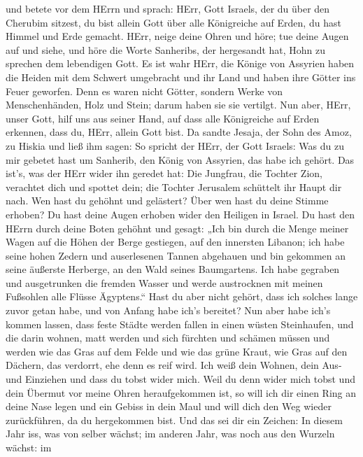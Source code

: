  und betete vor dem HErrn und sprach: HErr, Gott Israels,
der du über den Cherubim sitzest, du bist allein Gott über alle
Königreiche auf Erden, du hast Himmel und Erde gemacht. 
HErr, neige deine Ohren und höre; tue deine Augen auf und siehe, und
höre die Worte Sanheribs, der hergesandt hat, Hohn zu sprechen dem
lebendigen Gott.  Es ist wahr HErr, die Könige von Assyrien
haben die Heiden mit dem Schwert umgebracht und ihr Land 
und haben ihre Götter ins Feuer geworfen. Denn es waren nicht Götter,
sondern Werke von Menschenhänden, Holz und Stein; darum haben sie sie
vertilgt.  Nun aber, HErr, unser Gott, hilf uns aus seiner
Hand, auf dass alle Königreiche auf Erden erkennen, dass du, HErr,
allein Gott bist.  Da sandte Jesaja, der Sohn des Amoz, zu
Hiskia und ließ ihm sagen: So spricht der HErr, der Gott Israels: Was du
zu mir gebetet hast um Sanherib, den König von Assyrien, das habe ich
gehört.  Das ist's, was der HErr wider ihn geredet hat: Die
Jungfrau, die Tochter Zion, verachtet dich und spottet dein; die Tochter
Jerusalem schüttelt ihr Haupt dir nach.  Wen hast du
gehöhnt und gelästert? Über wen hast du deine Stimme erhoben? Du hast
deine Augen erhoben wider den Heiligen in Israel.  Du hast
den HErrn durch deine Boten gehöhnt und gesagt: „Ich bin durch die Menge
meiner Wagen auf die Höhen der Berge gestiegen, auf den innersten
Libanon; ich habe seine hohen Zedern und auserlesenen Tannen abgehauen
und bin gekommen an seine äußerste Herberge, an den Wald seines
Baumgartens.  Ich habe gegraben und ausgetrunken die
fremden Wasser und werde austrocknen mit meinen Fußsohlen alle Flüsse
Ägyptens.``  Hast du aber nicht gehört, dass ich solches
lange zuvor getan habe, und von Anfang habe ich's bereitet? Nun aber
habe ich's kommen lassen, dass feste Städte werden fallen in einen
wüsten Steinhaufen,  und die darin wohnen, matt werden und
sich fürchten und schämen müssen und werden wie das Gras auf dem Felde
und wie das grüne Kraut, wie Gras auf den Dächern, das verdorrt, ehe
denn es reif wird.  Ich weiß dein Wohnen, dein Aus- und
Einziehen und dass du tobst wider mich.  Weil du denn wider
mich tobst und dein Übermut vor meine Ohren heraufgekommen ist, so will
ich dir einen Ring an deine Nase legen und ein Gebiss in dein Maul und
will dich den Weg wieder zurückführen, da du hergekommen bist.
 Und das sei dir ein Zeichen: In diesem Jahr iss, was von
selber wächst; im anderen Jahr, was noch aus den Wurzeln wächst: im
